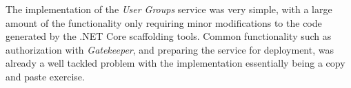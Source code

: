 The implementation of the \textit{User Groups} service was very simple, with a large amount of the functionality only requiring minor modifications to the code generated by the .NET Core scaffolding tools. Common functionality such as authorization with \textit{Gatekeeper}, and preparing the service for deployment, was already a well tackled problem with the implementation essentially being a copy and paste exercise. 
